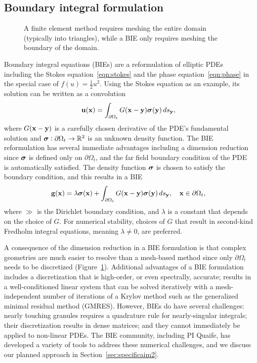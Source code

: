 \subsection{Boundary integral formulation}
\label{sec:bie}

\begin{figure}
  \caption{\label{fig:fem_vs_bie} \footnotesize A finite element method
  requires meshing the entire domain (typically into triangles), while a
  BIE only requires meshing the boundary of the domain.}
\end{figure}
Boundary integral equations (BIEs) are a reformulation of elliptic PDEs
including the Stokes equation~\eqref{eqn:stokes} and the phase
equation~\eqref{eqn:phase} in the special case of $f(u) =
\tfrac{1}{2}u^2$. Using the Stokes equation as an example, its solution
can be written as a convolution 
\begin{align*}
  \mathbf{u}(\mathbf{x}) = \int_{\partial\Omega_t} G(\mathbf{x} - \mathbf{y}) \boldsymbol{\sigma}(\mathbf{y}) \, ds_{\mathbf{y}},
\end{align*}
where $G(\mathbf{x} - \mathbf{y})$ is a carefully chosen derivative of the PDE's
fundamental solution and $\boldsymbol{\sigma}: \partial \Omega_t \rightarrow \mathbb{R}^2$
is an unknown density function. The BIE reformulation has several
immediate advantages including a dimension reduction since $\boldsymbol{\sigma}$ is
defined only on $\partial \Omega_t$, and the far field boundary
condition of the PDE is automatically satisfied. The density
function $\boldsymbol{\sigma}$ is chosen to satisfy the boundary condition, and this
results in a BIE 
\begin{align*}
  \mathbf{g}(\mathbf{x}) = \lambda \boldsymbol{\sigma}(\mathbf{x}) + 
    \int_{\partial\Omega_t} G(\mathbf{x} - \mathbf{y}) \boldsymbol{\sigma}(\mathbf{y}) \, ds_{\mathbf{y}},
    \quad \mathbf{x} \in \partial\Omega_t,
\end{align*}
where $\gg$ is the Dirichlet boundary condition, and $\lambda$ is a
constant that depends on the choice of $G$. For numerical stability,
choices of $G$ that result in second-kind Fredholm integral equations,
meaning $\lambda \neq 0$, are preferred.

A consequence of the dimension reduction in a BIE formulation is that
complex geometries are much easier to resolve than a mesh-based method
since only $\partial \Omega_t$ needs to be discretized
(Figure~\ref{fig:fem_vs_bie}). Additional advantages of a BIE
formulation includes a discretization that is high-order, or even
spectrally, accurate; results in a well-conditioned linear system that
can be solved iteratively with a mesh-independent number of iterations
of a Krylov method such as the generalized minimal residual method
(GMRES). However, BIEs do have several challenges: nearly touching
granules requires a quadrature rule for nearly-singular integrals; their
discretization results in dense matrices; and they cannot immediately be
applied to non-linear PDEs. The BIE community, including PI Quaife, has
developed a variety of tools to address these numerical challenges, and
we discuss our planned approach in Section~\ref{sec:specificaim2}.


